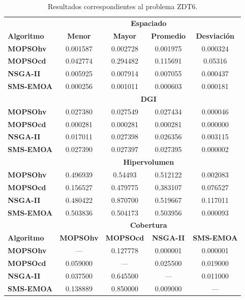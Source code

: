  \begin{table}
 \begin{center}
  \begin{tabular}{|l|cc|cc|} \hline
    & \multicolumn{4}{|c|}{\textbf{Espaciado}} \\ 
	\textbf{Algoritmo} & \textbf{Menor} & \textbf{Mayor} & \textbf{Promedio} & \textbf{Desviaci\'on} \\  \hline\hline
	\textbf{MOPSOhv} &0.001587 & 0.002728 & 0.001975 & 0.000324  \\ 
	\textbf{MOPSOcd} &0.042774 & 0.294482 & 0.115691 & 0.05316 \\ 
	\textbf{NSGA-II} &0.005925 & 0.007914 & 0.007055 & 0.000437  \\  
	\textbf{SMS-EMOA}&0.000256 & 0.001011 & 0.000603 & 0.000181 \\  
	\hline\hline
    & \multicolumn{4}{|c|}{\textbf{DGI}} \\ 	\hline \hline
	\textbf{MOPSOhv} &0.027380 & 0.027549 & 0.027434 & 0.000046  \\ 
	\textbf{MOPSOcd} &0.000281 & 0.000281 & 0.000281 & 0.000000  \\ 
	\textbf{NSGA-II} &0.017011 & 0.027398 & 0.026356 & 0.003115  \\  
	\textbf{SMS-EMOA}&0.027390 & 0.027397 & 0.027395 & 0.000002  \\  
	\hline\hline
    & \multicolumn{4}{|c|}{\textbf{Hipervolumen}} \\ \hline \hline
	\textbf{MOPSOhv} &0.496939 & 0.54493 & 0.512122 & 0.002083  \\ 
	\textbf{MOPSOcd} &0.156527 & 0.479775 & 0.383107 & 0.076527 \\ 
	\textbf{NSGA-II} &0.480422 & 0.870700 & 0.519667 & 0.117011 \\  
	\textbf{SMS-EMOA}&0.503836 & 0.504173 & 0.503956 & 0.000093 \\  
	\hline\hline
    & \multicolumn{4}{|c|}{\textbf{Cobertura}} \\ \hline\hline 
	\textbf{Algoritmo} & \textbf{MOPSOhv} & \textbf{MOPSOcd} & \textbf{NSGA-II} & \textbf{SMS-EMOA} \\  \hline \hline
	\textbf{MOPSOhv} &---       & 0.127778 & 0.000001  & 0.000001 \\ 
	\textbf{MOPSOcd} & 0.059000 & ---      & 0.025500  & 0.019000  \\ 
	\textbf{NSGA-II} & 0.037500 & 0.645500 & ---       & 0.011000 \\  
	\textbf{SMS-EMOA}& 0.138889 & 0.850000 & 0.009000  & --- \\  
	\hline
	\end{tabular}
\caption{Resultados correspondientes al problema ZDT6.}
  \label{tab:zdt6}
\end{center}
\end{table}
\clearpage
\newpage

